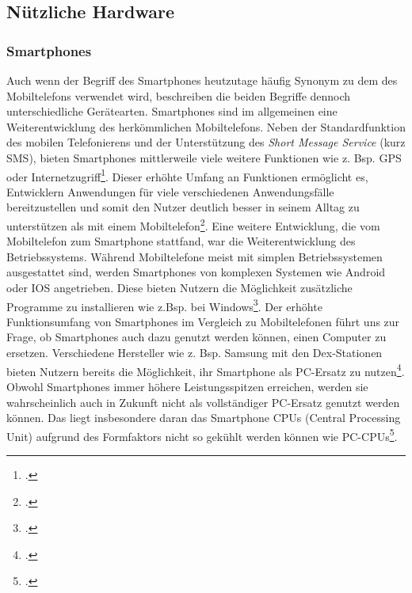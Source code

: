 \subsection{Nützliche Hardware}
\subsubsection{Smartphones}
Auch wenn der Begriff des Smartphones heutzutage häufig Synonym zu dem des Mobiltelefons verwendet wird, beschreiben die beiden Begriffe dennoch unterschiedliche Gerätearten. Smartphones sind im allgemeinen eine Weiterentwicklung des herkömmlichen Mobiltelefons. Neben der Standardfunktion des mobilen Telefonierens und der Unterstützung des \textit{Short Message Service} (kurz SMS), bieten Smartphones mittlerweile viele weitere Funktionen wie z. Bsp. GPS oder Internetzugriff\footcite[Vgl. ][S.3 Z.5ff]{Bou11}.\newline
Dieser erhöhte Umfang an Funktionen ermöglicht es, Entwicklern Anwendungen für viele verschiedenen Anwendungsfälle bereitzustellen und somit den Nutzer deutlich besser in seinem Alltag zu unterstützen als mit einem Mobiltelefon\footcite[Vgl. ][Smartphones are tiny Computers]{Ada18}. Eine weitere Entwicklung, die vom Mobiltelefon zum Smartphone stattfand, war die Weiterentwicklung des Betriebssystems. Während Mobiltelefone meist mit simplen Betriebssystemen ausgestattet sind, werden Smartphones von komplexen Systemen wie Android oder IOS angetrieben. Diese bieten Nutzern die Möglichkeit zusätzliche Programme zu installieren wie z.Bsp. bei Windows\footcite[Vgl. ][Mobile Operating Systems]{Ada18}.\newline
Der erhöhte Funktionsumfang von Smartphones im Vergleich zu Mobiltelefonen führt uns zur Frage, ob Smartphones auch dazu genutzt werden können, einen Computer zu ersetzen. Verschiedene Hersteller wie z. Bsp. Samsung mit den Dex-Stationen bieten Nutzern bereits die Möglichkeit, ihr Smartphone als PC-Ersatz zu nutzen\footcite{Kai18}. Obwohl Smartphones immer höhere Leistungsspitzen erreichen, werden sie wahrscheinlich auch in Zukunft nicht als vollständiger PC-Ersatz genutzt werden können. Das liegt insbesondere daran das Smartphone CPUs (Central Processing Unit) aufgrund des Formfaktors nicht so gekühlt werden können wie PC-CPUs\footcite[Vgl. ][Power and Heat]{Gav18}.\newline 
